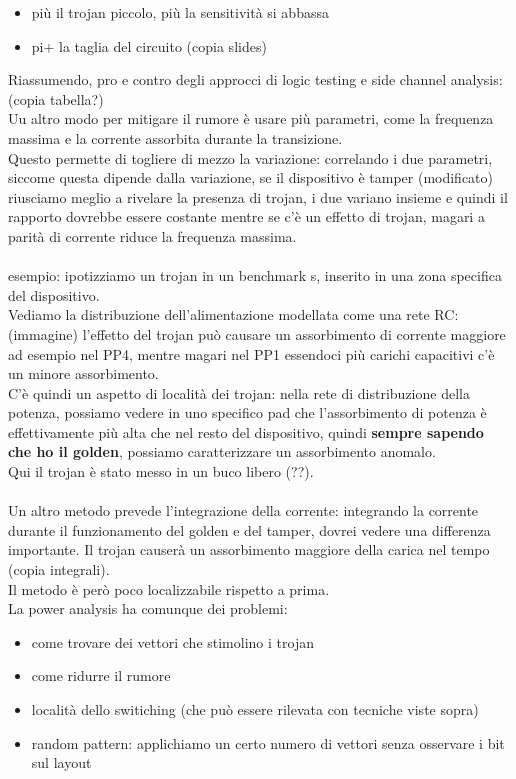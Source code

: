 \documentclass[oneside, 12pt]{extbook}
\begin{document}
\begin{itemize}
	\item più il trojan piccolo, più la sensitività si abbassa
	\item pi+ la taglia del circuito (copia slides)
\end{itemize}
Riassumendo, pro e contro degli approcci di logic testing e side channel analysis: (copia tabella?)\\Uu altro modo per mitigare il rumore è usare più parametri, come la frequenza massima e la corrente assorbita durante la transizione.\\Questo permette di togliere di mezzo la variazione: correlando i due parametri, siccome questa dipende dalla variazione, se il dispositivo è tamper (modificato) riusciamo meglio a rivelare la presenza di trojan, i due variano insieme e quindi il rapporto dovrebbe essere costante mentre se c'è un effetto di trojan, magari a parità di corrente riduce la frequenza massima.\\\\esempio: ipotizziamo un trojan in un benchmark s, inserito in una zona specifica del dispositivo.\\Vediamo la distribuzione dell'alimentazione modellata come una rete RC: (immagine) l'effetto del trojan può causare un assorbimento di corrente maggiore ad esempio nel PP4, mentre magari nel PP1 essendoci più carichi capacitivi c'è un minore assorbimento.\\C'è quindi un aspetto di località dei trojan: nella rete di distribuzione della potenza, possiamo vedere in uno specifico pad che l'assorbimento di potenza è effettivamente più alta che nel resto del dispositivo, quindi \textbf{sempre sapendo che ho il golden}, possiamo caratterizzare un assorbimento anomalo.\\Qui il trojan è stato messo in un buco libero (??).\\\\Un altro metodo prevede l'integrazione della corrente: integrando la corrente durante il funzionamento del golden e del tamper, dovrei vedere una differenza importante. Il trojan causerà un assorbimento maggiore della carica nel tempo (copia integrali).\\Il metodo è però poco localizzabile rispetto a prima.\\La power analysis ha comunque dei problemi:
\begin{itemize}
	\item come trovare dei vettori che stimolino i trojan
	\item come ridurre il rumore
	\item località dello switiching (che può essere rilevata con tecniche viste sopra)
	\item random pattern: applichiamo un certo numero di vettori senza osservare i bit sul layout
\end{itemize}
\end{document}
